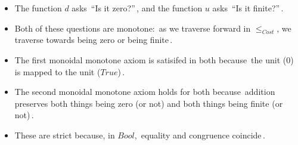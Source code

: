 \begin{itemize}
    \item The function $d$ asks \,``Is it zero?''\,, and the function $u$ asks \,``Is it finite?''\,.
    \item Both of these questions are monotone: \,as we traverse forward in $\leq_{Cost}$, we traverse towards being zero or being finite\,.
    \item The first monoidal monotone axiom is satisifed in both because \,the unit ($0$) is mapped to the unit ($True$)\,.
    \item The second monoidal monotone axiom holds for both because \,addition preserves both things being zero (or not) and both things being finite (or not)\,.
    \item These are strict because, in $Bool$, \,equality and congruence coincide\,.
  \end{itemize}
